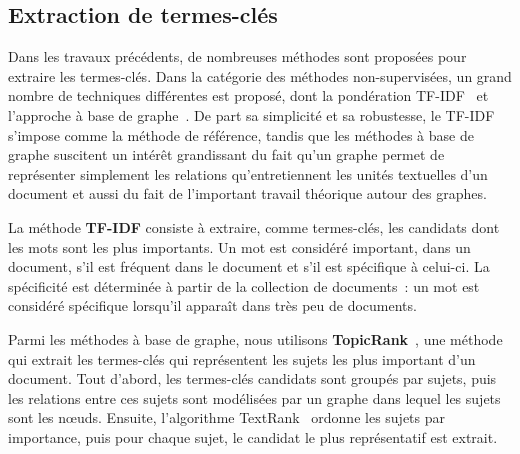   \subsection{Extraction de termes-clés}
  \label{subsec:extraction_de_termes_cles}
    Dans les travaux précédents, de nombreuses méthodes sont proposées pour
    extraire les termes-clés. Dans la catégorie des méthodes non-supervisées, un
    grand nombre de techniques différentes est proposé, dont la pondération
    TF-IDF~\cite{jones1972tfidf} et l'approche à base de
    graphe~\cite{mihalcea2004textrank}. De part sa simplicité et sa robustesse,
    le TF-IDF s'impose comme la méthode de référence, tandis que les méthodes à
    base de graphe suscitent un intérêt grandissant du fait qu'un graphe permet
    de représenter simplement les relations qu'entretiennent les unités
    textuelles d'un document et aussi du fait de l'important travail théorique
    autour des graphes.

    La méthode \textbf{TF-IDF} consiste à extraire, comme termes-clés, les
    candidats dont les mots sont les plus importants. Un mot est considéré
    important, dans un document, s'il est fréquent dans le document et s'il est
    spécifique à celui-ci. La spécificité est déterminée à partir de la
    collection de documents~: un mot est considéré spécifique lorsqu'il apparaît
    dans très peu de documents.

    Parmi les méthodes à base de graphe, nous utilisons
    \textbf{TopicRank}~\cite{bougouin2013topicrank}, une méthode qui extrait les
    termes-clés qui représentent les sujets les plus important d'un document.
    Tout d'abord, les termes-clés candidats sont groupés par sujets, puis les
    relations entre ces sujets sont modélisées par un graphe dans lequel les
    sujets sont les n\oe{}uds. Ensuite, l'algorithme
    TextRank~\cite{mihalcea2004textrank} ordonne les sujets par importance, puis
    pour chaque sujet, le candidat le plus représentatif est extrait.

